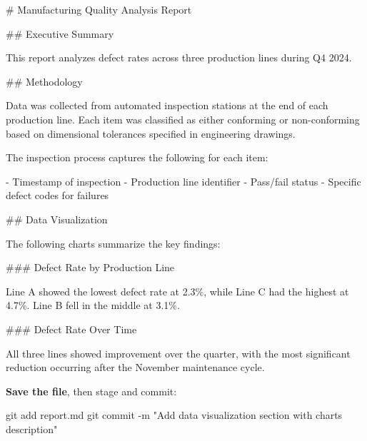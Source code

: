 \documentclass[
  letterpaper,
  DIV=11,
  numbers=noendperiod]{scrreprt}
\newenvironment{Shaded}{\begin{snugshade}}{\end{snugshade}}
\newcommand{\AttributeTok}[1]{\textcolor[rgb]{0.40,0.45,0.13}{#1}}
\newcommand{\FunctionTok}[1]{\textcolor[rgb]{0.28,0.35,0.67}{#1}}
\newcommand{\NormalTok}[1]{\textcolor[rgb]{0.00,0.23,0.31}{#1}}
\newcommand{\SpecialStringTok}[1]{\textcolor[rgb]{0.13,0.47,0.30}{#1}}
\newcommand{\StringTok}[1]{\textcolor[rgb]{0.13,0.47,0.30}{#1}}
\begin{document}
\begin{codelisting}

\caption{\texttt{report.md}}

\begin{Shaded}
\begin{Highlighting}[]
\FunctionTok{\# Manufacturing Quality Analysis Report}

\FunctionTok{\#\# Executive Summary}

\NormalTok{This report analyzes defect rates across three production lines}
\NormalTok{during Q4 2024.}

\FunctionTok{\#\# Methodology}

\NormalTok{Data was collected from automated inspection stations at the end of}
\NormalTok{each production line. Each item was classified as either conforming}
\NormalTok{or non{-}conforming based on dimensional tolerances specified in}
\NormalTok{engineering drawings.}

\NormalTok{The inspection process captures the following for each item:}

\SpecialStringTok{{-} }\NormalTok{Timestamp of inspection}
\SpecialStringTok{{-} }\NormalTok{Production line identifier}
\SpecialStringTok{{-} }\NormalTok{Pass/fail status}
\SpecialStringTok{{-} }\NormalTok{Specific defect codes for failures}

\FunctionTok{\#\# Data Visualization}

\NormalTok{The following charts summarize the key findings:}

\FunctionTok{\#\#\# Defect Rate by Production Line}

\NormalTok{Line A showed the lowest defect rate at 2.3\%, while Line C had the}
\NormalTok{highest at 4.7\%. Line B fell in the middle at 3.1\%.}

\FunctionTok{\#\#\# Defect Rate Over Time}

\NormalTok{All three lines showed improvement over the quarter, with the most}
\NormalTok{significant reduction occurring after the November maintenance cycle.}
\end{Highlighting}
\end{Shaded}

\end{codelisting}

\textbf{Save the file}, then stage and commit:

\begin{codelisting}

\caption{\texttt{terminal}}

\begin{Shaded}
\begin{Highlighting}[]
\FunctionTok{git}\NormalTok{ add report.md}
\FunctionTok{git}\NormalTok{ commit }\AttributeTok{{-}m} \StringTok{"Add data visualization section with charts description"}
\end{Highlighting}
\end{Shaded}

\end{codelisting}
\end{document}
